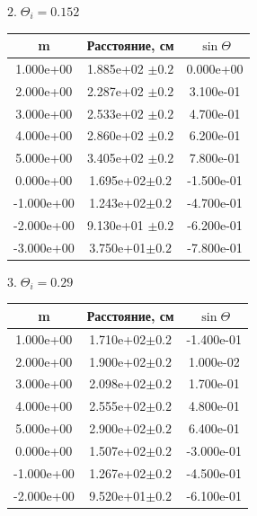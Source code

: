 \documentclass[a4paper, 12pt]{article}
\begin{document}
$2.\; \Theta_i = 0.152$\\
\begin{center}
\begin{tabular}{| c| c | c |}
\hline
m  &  Расстояние, см & $\sin\Theta $\\ 
\hline
 1.000e+00 & 1.885e+02 $\pm0.2$ & 0.000e+00\\
 2.000e+00 & 2.287e+02 $\pm0.2$ & 3.100e-01\\
 3.000e+00 & 2.533e+02 $\pm0.2$ & 4.700e-01\\
 4.000e+00 & 2.860e+02 $\pm0.2$ & 6.200e-01\\
 5.000e+00 & 3.405e+02 $\pm0.2$ & 7.800e-01\\
 0.000e+00 & 1.695e+02$\pm0.2$  & -1.500e-01\\
-1.000e+00 & 1.243e+02$\pm0.2$  & -4.700e-01\\
-2.000e+00 & 9.130e+01 $\pm0.2$ & -6.200e-01\\
-3.000e+00 & 3.750e+01$\pm0.2$  & -7.800e-01\\
\hline
\end{tabular}
\end{center}





$3. \;\Theta_i = 0.29$\\
\begin{center}
\begin{tabular}{| c| c | c |}
\hline
m  &  Расстояние, см & $\sin\Theta $\\ 
\hline
 1.000e+00 & 1.710e+02$\pm0.2$  & -1.400e-01 \\
 2.000e+00 & 1.900e+02$\pm0.2$  & 1.000e-02 \\
 3.000e+00 & 2.098e+02$\pm0.2$  & 1.700e-01  \\
 4.000e+00 & 2.555e+02$\pm0.2$  & 4.800e-01  \\
 5.000e+00 & 2.900e+02$\pm0.2$  & 6.400e-01  \\
 0.000e+00 & 1.507e+02$\pm0.2$  & -3.000e-01  \\
-1.000e+00 & 1.267e+02$\pm0.2$  & -4.500e-01  \\
-2.000e+00 & 9.520e+01$\pm0.2$  & -6.100e-01 \\
\hline
\end{tabular}
\end{center}
\end{document}
